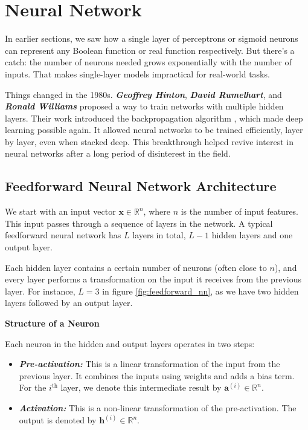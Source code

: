 \section{Neural Network}

In earlier sections, we saw how a single layer of perceptrons or sigmoid neurons can represent any Boolean function or real function respectively. But there's a catch: the number of neurons needed grows exponentially with the number of inputs. That makes single-layer models impractical for real-world tasks.

Things changed in the 1980s. \textbf{\textit{Geoffrey Hinton}}, \textbf{\textit{David Rumelhart}}, and \textbf{\textit{Ronald Williams}} proposed a way to train networks with multiple hidden layers. Their work introduced the backpropagation algorithm \cite{rumelhart1986learning}, which made deep learning possible again. It allowed neural networks to be trained efficiently, layer by layer, even when stacked deep. This breakthrough helped revive interest in neural networks after a long period of disinterest in the field.

\subsection{Feedforward Neural Network Architecture}

We start with an input vector \( \mathbf{x} \in \mathbb{R}^n \), where \( n \) is the number of input features. This input passes through a sequence of layers in the network. A typical feedforward neural network has \( L \) layers in total, \( L - 1 \) hidden layers and one output layer.

Each hidden layer contains a certain number of neurons (often close to \( n \)), and every layer performs a transformation on the input it receives from the previous layer. For instance, \( L = 3 \) in figure \ref{fig:feedforward_nn}, as we have two hidden layers followed by an output layer.

\textbf{Structure of a Neuron}

Each neuron in the hidden and output layers operates in two steps:
\vspace{-5pt}
\begin{itemize}
    \item \textbf{\textit{Pre-activation:}} This is a linear transformation of the input from the previous layer. It combines the inputs using weights and adds a bias term. For the \( i^{\text{th}} \) layer, we denote this intermediate result by \( \mathbf{a}^{(i)} \in \mathbb{R}^n \).
    
    \item \textbf{\textit{Activation:}} This is a non-linear transformation of the pre-activation. The output is denoted by \( \mathbf{h}^{(i)} \in \mathbb{R}^n \).
\end{itemize}

